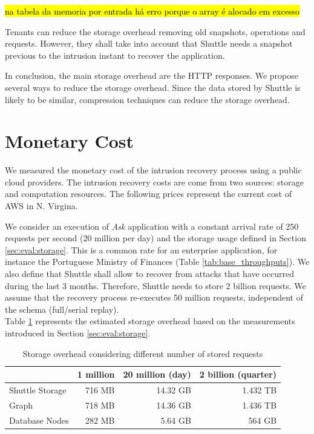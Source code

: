 \hl{na tabela da memoria por entrada há erro porque o array é alocado em excesso}


Tenants can reduce the storage overhead removing old snapshots, operations and requests. However, they shall take into account that Shuttle needs a snapshot previous to the intrusion instant to recover the application.

In conclusion, the main storage overhead are the \ac{HTTP} responses. We propose several ways to reduce the storage overhead. Since the data stored by Shuttle is likely to be similar, compression techniques can reduce the storage overhead.



\section{Monetary Cost}\label{sec:eval:cost}
We measured the monetary cost of the intrusion recovery process using a public cloud providers. The intrusion recovery costs are come from two sources: storage and computation resources. The following prices represent the current cost of \acf{AWS} in N. Virgina.

We consider an execution of \emph{Ask} application with a constant arrival rate of 250 requests per second (20 million per day) and the storage usage defined in Section \ref{sec:eval:storage}. This is a common rate for an enterprise application, for instance the Portuguese Ministry of Finances (Table \ref{tab:base_throughputs}). We also define that Shuttle shall allow to recover from attacks that have occurred during the last 3 months. Therefore, Shuttle needs to store 2 billion requests. We assume that the recovery process re-executes 50 million requests, independent of the schema (full/serial replay). \\

Table \ref{tab:storageScale} represents the estimated storage overhead based on the measurements introduced in Section \ref{sec:eval:storage}. %

\begin{table}[ht]
\centering
\begin{tabular}{l|rrr}
                  & 1 million   & 20 million (day)    & 2 billion (quarter) \\ \hline
Shuttle Storage   & 716 MB      & 14.32 GB            & 1.432 TB \\
Graph             & 718 MB      & 14.36 GB            & 1.436 TB \\
Database Nodes    & 282 MB      &  5.64 GB            & 564 GB   \\
\end{tabular}
\caption{Storage overhead considering different number of stored requests}
\label{tab:storageScale}
\end{table}


